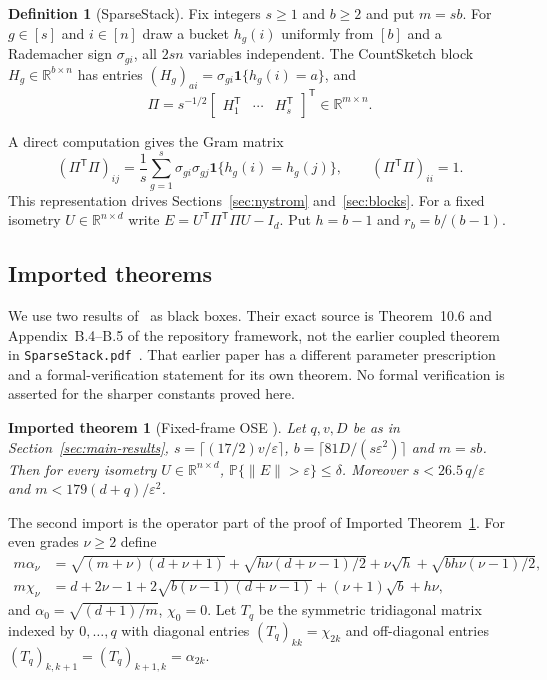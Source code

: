 \documentclass[11pt,a4paper]{article}
\newtheorem{imported}[theorem]{Imported theorem}
\theoremstyle{definition}
\newtheorem{definition}[theorem]{Definition}
\theoremstyle{remark}
\newcommand{\Prob}{\mathbb P}
\newcommand{\R}{\mathbb R}
\newcommand{\eps}{\varepsilon}
\newcommand{\norm}[1]{\lVert#1\rVert}
\newcommand{\1}{\mathbf 1}
\newcommand{\T}{\mathsf T}
\begin{document}
\begin{definition}[SparseStack]\label{def:ss}
Fix integers $s\ge1$ and $b\ge2$ and put $m=sb$. For $g\in[s]$ and
$i\in[n]$ draw a bucket $h_g(i)$ uniformly from $[b]$ and a Rademacher
sign $\sigma_{gi}$, all $2sn$ variables independent. The CountSketch
block $H_g\in\R^{b\times n}$ has entries
$(H_g)_{ai}=\sigma_{gi}\1\{h_g(i)=a\}$, and
\[
 \Pi=s^{-1/2}\begin{bmatrix}H_1^\T&\cdots&H_s^\T\end{bmatrix}^\T
 \in\R^{m\times n}.
\]
\end{definition}

A direct computation gives the Gram matrix
\begin{equation}\label{eq:gram}
 (\Pi^\T\Pi)_{ij}=\frac1s\sum_{g=1}^s\sigma_{gi}\sigma_{gj}\1\{h_g(i)=h_g(j)\},
 \qquad (\Pi^\T\Pi)_{ii}=1.
\end{equation}
This representation drives Sections~\ref{sec:nystrom}
and~\ref{sec:blocks}. For a fixed isometry $U\in\R^{n\times d}$ write
$E=U^\T\Pi^\T\Pi U-I_d$. Put $h=b-1$ and $r_b=b/(b-1)$.

\subsection{Imported theorems}
We use two results of~\cite{SS} as black boxes. Their exact source is
Theorem~10.6 and Appendix~B.4--B.5 of the repository framework, not the
earlier coupled theorem in \texttt{SparseStack.pdf}~\cite{SSOriginal}.
That earlier paper has a different parameter prescription and a
formal-verification statement for its own theorem. No formal
verification is asserted for the sharper constants proved here.

\begin{imported}[Fixed-frame OSE {\cite[Theorem~10.6]{SS}}]\label{imp:ose}
Let $q,v,D$ be as in Section~\ref{sec:main-results}, $s=\lceil(17/2)v/\eps\rceil$,
$b=\lceil81D/(s\eps^2)\rceil$ and $m=sb$. Then for every isometry
$U\in\R^{n\times d}$, $\Prob\{\norm E>\eps\}\le\delta$. Moreover
$s<26.5\,q/\eps$ and $m<179(d+q)/\eps^2$.
\end{imported}

The second import is the operator part of the proof of
Imported Theorem~\ref{imp:ose}. For even grades $\nu\ge2$ define
\begin{align}
 m\alpha_\nu&=\sqrt{(m+\nu)(d+\nu+1)}+\sqrt{h\nu(d+\nu-1)/2}
   +\nu\sqrt h+\sqrt{bh\nu(\nu-1)/2},\label{eq:alpha}\\
 m\chi_\nu&=d+2\nu-1+2\sqrt{b(\nu-1)(d+\nu-1)}+(\nu+1)\sqrt b+h\nu,
   \label{eq:chi}
\end{align}
and $\alpha_0=\sqrt{(d+1)/m}$, $\chi_0=0$. Let $T_q$ be the symmetric
tridiagonal matrix indexed by $0,\ldots,q$ with diagonal entries
$(T_q)_{kk}=\chi_{2k}$ and off-diagonal entries
$(T_q)_{k,k+1}=(T_q)_{k+1,k}=\alpha_{2k}$.
\end{document}
